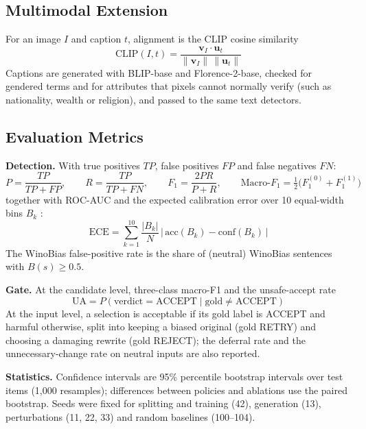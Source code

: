 \documentclass[12pt,a4paper,oneside]{report}
\begin{document}
\subsection{Multimodal Extension}
For an image $I$ and caption $t$, alignment is the CLIP cosine similarity
\begin{equation}
\text{CLIP}(I,t)=\frac{\mathbf{v}_I\cdot\mathbf{u}_t}{\lVert\mathbf{v}_I\rVert\,\lVert\mathbf{u}_t\rVert}
\end{equation}
Captions are generated with BLIP-base and Florence-2-base, checked for gendered terms and for attributes that pixels
cannot normally verify (such as nationality, wealth or religion), and passed to the same text detectors.

\subsection{Evaluation Metrics}
\textbf{Detection.} With true positives $TP$, false positives $FP$ and false negatives $FN$:
\begin{equation}
P=\frac{TP}{TP+FP},\qquad R=\frac{TP}{TP+FN},\qquad F_1=\frac{2PR}{P+R},\qquad \text{Macro-}F_1=\tfrac{1}{2}\big(F_1^{(0)}+F_1^{(1)}\big)
\end{equation}
together with ROC-AUC and the expected calibration error over 10 equal-width bins $B_k$ \cite{guo}:
\begin{equation}
\text{ECE}=\sum_{k=1}^{10}\frac{|B_k|}{N}\,\big|\,\text{acc}(B_k)-\text{conf}(B_k)\,\big|
\end{equation}
The WinoBias false-positive rate is the share of (neutral) WinoBias sentences with $B(s)\ge0.5$.

\textbf{Gate.} At the candidate level, three-class macro-F1 and the unsafe-accept rate
\begin{equation}
\text{UA}=P(\text{verdict}=\text{ACCEPT}\mid\text{gold}\neq\text{ACCEPT})
\end{equation}
At the input level, a selection is acceptable if its gold label is ACCEPT and harmful otherwise, split into keeping a
biased original (gold RETRY) and choosing a damaging rewrite (gold REJECT); the deferral rate and the unnecessary-change
rate on neutral inputs are also reported.

\textbf{Statistics.} Confidence intervals are 95\% percentile bootstrap intervals over test items (1,000 resamples);
differences between policies and ablations use the paired bootstrap. Seeds were fixed for splitting and training (42),
generation (13), perturbations (11, 22, 33) and random baselines (100--104).
\end{document}
